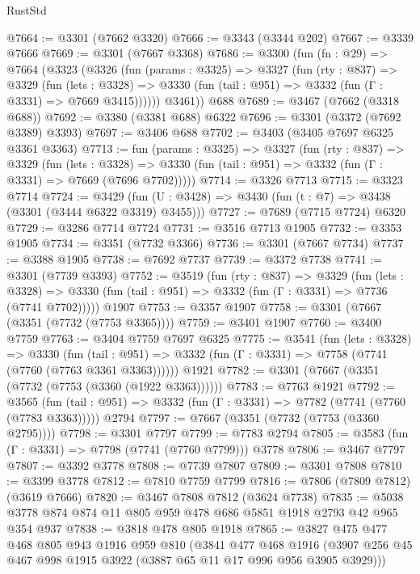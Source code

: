 \begin{lexlean}{RustStd}
\begin{coremodule}
@7664 := @3301 (@7662 @3320)
@7666 := @3343 (@3344 @202)
@7667 := @3339 @7666
@7669 := @3301 (@7667 @3368)
@7686 := @3300
    (fun (fn : @29) =>
    @7664
      (@3323
        (@3326
          (fun (params : @3325) =>
          @3327
            (fun (rty : @837) =>
            @3329
              (fun (lets : @3328) =>
              @3330 (fun (tail : @951) => @3332 (fun (Γ : @3331) => @7669 @3415))))))
        @3461))
    @688
@7689 := @3467 (@7662 (@3318 @688))
@7692 := @3380 (@3381 @688) @6322
@7696 := @3301 (@3372 (@7692 @3389) @3393)
@7697 := @3406 @688
@7702 := @3403 (@3405 @7697 @6325 @3361 @3363)
@7713 := fun (params : @3325) =>
  @3327
    (fun (rty : @837) =>
    @3329
      (fun (lets : @3328) =>
      @3330 (fun (tail : @951) => @3332 (fun (Γ : @3331) => @7669 (@7696 @7702)))))
@7714 := @3326 @7713
@7715 := @3323 @7714
@7724 := @3429 (fun (U : @3428) => @3430 (fun (t : @7) => @3438 (@3301 (@3444 @6322 @3319) @3455)))
@7727 := @7689 (@7715 @7724) @6320
@7729 := @3286 @7714 @7724
@7731 := @3516 @7713 @1905
@7732 := @3353 @1905
@7734 := @3351 (@7732 @3366)
@7736 := @3301 (@7667 @7734)
@7737 := @3388 @1905
@7738 := @7692 @7737
@7739 := @3372 @7738
@7741 := @3301 (@7739 @3393)
@7752 := @3519
    (fun (rty : @837) =>
    @3329
      (fun (lets : @3328) =>
      @3330 (fun (tail : @951) => @3332 (fun (Γ : @3331) => @7736 (@7741 @7702)))))
    @1907
@7753 := @3357 @1907
@7758 := @3301 (@7667 (@3351 (@7732 (@7753 @3365))))
@7759 := @3401 @1907
@7760 := @3400 @7759
@7763 := @3404 @7759 @7697 @6325
@7775 := @3541
    (fun (lets : @3328) =>
    @3330
      (fun (tail : @951) => @3332 (fun (Γ : @3331) => @7758 (@7741 (@7760 (@7763 @3361 @3363))))))
    @1921
@7782 := @3301 (@7667 (@3351 (@7732 (@7753 (@3360 (@1922 @3363))))))
@7783 := @7763 @1921
@7792 := @3565
    (fun (tail : @951) => @3332 (fun (Γ : @3331) => @7782 (@7741 (@7760 (@7783 @3363)))))
    @2794
@7797 := @7667 (@3351 (@7732 (@7753 (@3360 @2795))))
@7798 := @3301 @7797
@7799 := @7783 @2794
@7805 := @3583 (fun (Γ : @3331) => @7798 (@7741 (@7760 @7799))) @3778
@7806 := @3467 @7797
@7807 := @3392 @3778
@7808 := @7739 @7807
@7809 := @3301 @7808
@7810 := @3399 @3778
@7812 := @7810 @7759 @7799
@7816 := @7806 (@7809 @7812) (@3619 @7666)
@7820 := @3467 @7808 @7812 (@3624 @7738)
@7835 := @5038 @3778 @874 @874 @11 @805 @959 @478 @686 @5851 @1918 @2793 @42 @965 @354 @937
@7838 := @3818 @478 @805 @1918
@7865 := @3827
    @475
    @477
    @468
    @805
    @943
    @1916
    @959
    @810
    (@3841
      @477
      @468
      @1916
      (@3907 @256 @45 @467 @998 @1915 @3922 (@3887 @65 @11 @17 @996 @956 @3905 @3929)))

\end{coremodule}
\end{lexlean}
